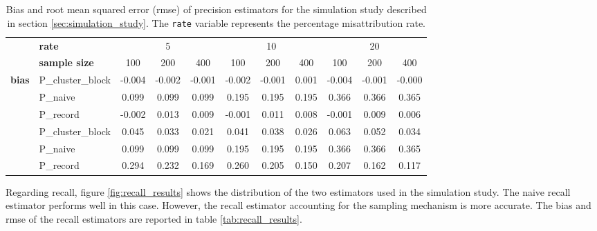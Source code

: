 \documentclass[fontsize=11pt]{article}
\theoremstyle{definition}
\begin{document}
\begin{table}
    \centering
    \caption{\label{tab:precision_results}\centering Bias and root mean squared error (rmse) of precision estimators for the simulation study described in section \ref{sec:simulation_study}. The \texttt{rate} variable represents the percentage misattribution rate.}
\begin{tabular}{llccccccccc}
\toprule
{} & \hfill{\textbf{rate}} & \multicolumn{3}{c}{5} & \multicolumn{3}{c}{10} & \multicolumn{3}{c}{20} \\
\cmidrule(lr){3-5}\cmidrule(lr){6-8}\cmidrule(lr){9-11}
{} & \hfill{\textbf{sample size}} & {100} & {200} & {400} & {100} & {200} & {400} & {100} & {200} & {400} \\
\midrule
\multirow[c]{4}{*}{\textbf{bias}} & P\_cluster\_block & -0.004 & -0.002 & -0.001 & -0.002 & -0.001 & 0.001 & -0.004 & -0.001 & -0.000 \\
 & P\_naive & 0.099 & 0.099 & 0.099 & 0.195 & 0.195 & 0.195 & 0.366 & 0.366 & 0.365 \\
 & P\_record & -0.002 & 0.013 & 0.009 & -0.001 & 0.011 & 0.008 & -0.001 & 0.009 & 0.006 \\
\midrule
\multirow[c]{4}{*}{\textbf{rmse}} & P\_cluster\_block & 0.045 & 0.033 & 0.021 & 0.041 & 0.038 & 0.026 & 0.063 & 0.052 & 0.034 \\
 & P\_naive & 0.099 & 0.099 & 0.099 & 0.195 & 0.195 & 0.195 & 0.366 & 0.366 & 0.365 \\
 & P\_record & 0.294 & 0.232 & 0.169 & 0.260 & 0.205 & 0.150 & 0.207 & 0.162 & 0.117 \\
\bottomrule
\end{tabular}
\end{table}

Regarding recall, figure \ref{fig:recall_results} shows the distribution of the two estimators used in the simulation study. The naive recall estimator performs well in this case. However, the recall estimator accounting for the sampling mechanism is more accurate. The bias and rmse of the recall estimators are reported in table \ref{tab:recall_results}.
\end{document}
